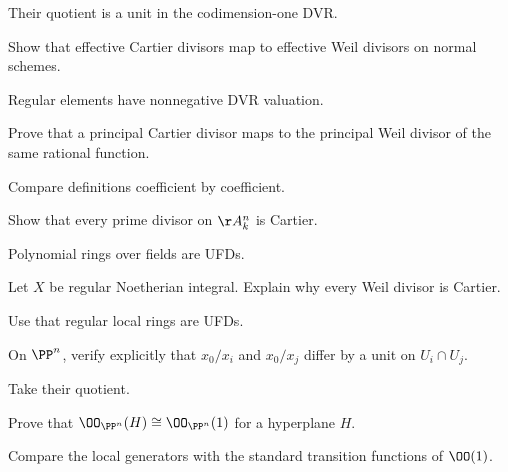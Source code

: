\ifdefined\IncludeExerciseHints
\begin{hint}
Their quotient is a unit in the codimension-one DVR.
\end{hint}
\fi
\begin{exercise}\label{exr:vi40-13}
Show that effective Cartier divisors map to effective Weil divisors on normal schemes.
\end{exercise}
\ifdefined\IncludeExerciseHints
\begin{hint}
Regular elements have nonnegative DVR valuation.
\end{hint}
\fi
\begin{exercise}\label{exr:vi40-14}
Prove that a principal Cartier divisor maps to the principal Weil divisor of the same rational function.
\end{exercise}
\ifdefined\IncludeExerciseHints
\begin{hint}
Compare definitions coefficient by coefficient.
\end{hint}
\fi
\begin{exercise}\label{exr:vi40-15}
Show that every prime divisor on \(\AA^n_k\) is Cartier.
\end{exercise}
\ifdefined\IncludeExerciseHints
\begin{hint}
Polynomial rings over fields are UFDs.
\end{hint}
\fi
\begin{exercise}\label{exr:vi40-16}
Let \(X\) be regular Noetherian integral.  Explain why every Weil divisor is Cartier.
\end{exercise}
\ifdefined\IncludeExerciseHints
\begin{hint}
Use that regular local rings are UFDs.
\end{hint}
\fi
\begin{exercise}\label{exr:vi40-17}
On \(\PP^n\), verify explicitly that \(x_0/x_i\) and \(x_0/x_j\) differ by a unit on \(U_i\cap U_j\).
\end{exercise}
\ifdefined\IncludeExerciseHints
\begin{hint}
Take their quotient.
\end{hint}
\fi
\begin{exercise}\label{exr:vi40-18}
Prove that \(\OO_{\PP^n}(H)\cong\OO_{\PP^n}(1)\) for a hyperplane \(H\).
\end{exercise}
\ifdefined\IncludeExerciseHints
\begin{hint}
Compare the local generators with the standard transition functions of \(\OO(1)\).
\end{hint}
